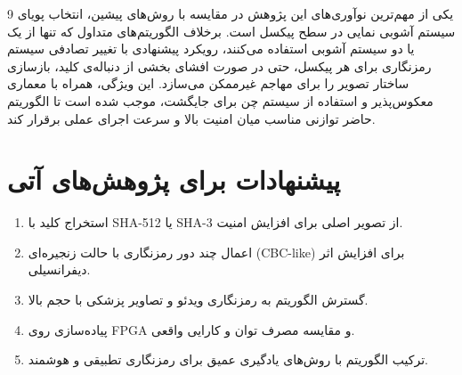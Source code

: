 \documentclass[a4paper,12pt]{report}
\renewcommand{\%}{\lr{\oldpercent}}
\providecommand{\lr}[1]{#1}
\begin{document}
یکی از مهم‌ترین نوآوری‌های این پژوهش در مقایسه با روش‌های پیشین، انتخاب پویای 9 سیستم آشوبی نمایی در سطح پیکسل است. برخلاف الگوریتم‌های متداول که تنها از یک یا دو سیستم آشوبی استفاده می‌کنند، رویکرد پیشنهادی با تغییر تصادفی سیستم رمزنگاری برای هر پیکسل، حتی در صورت افشای بخشی از دنباله‌ی کلید، بازسازی ساختار تصویر را برای مهاجم غیرممکن می‌سازد. این ویژگی، همراه با معماری معکوس‌پذیر و استفاده از سیستم چن برای جایگشت، موجب شده است تا الگوریتم حاضر توازنی مناسب میان امنیت بالا و سرعت اجرای عملی برقرار کند.

\section{پیشنهادات برای پژوهش‌های آتی}
\begin{enumerate}
    \item استخراج کلید با \lr{SHA-512} یا \lr{SHA-3} از تصویر اصلی برای افزایش امنیت.
    \item اعمال چند دور رمزنگاری با حالت زنجیره‌ای (\lr{CBC-like}) برای افزایش اثر دیفرانسیلی.
    \item گسترش الگوریتم به رمزنگاری ویدئو و تصاویر پزشکی با حجم بالا.
    \item پیاده‌سازی روی \lr{FPGA} و مقایسه مصرف توان و کارایی واقعی.
    \item ترکیب الگوریتم با روش‌های یادگیری عمیق برای رمزنگاری تطبیقی و هوشمند.
\end{enumerate}

\newpage

\end{document}
